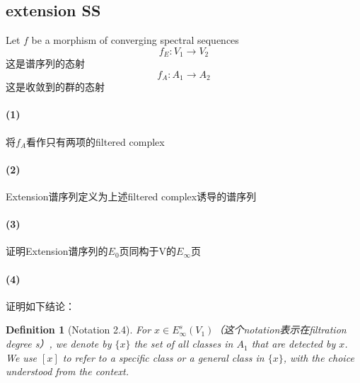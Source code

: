 \documentclass[12pt,a4paper]{article}
\title{}
\author{}
\newtheorem{defn}[equation]{Definition}
\begin{document}
\sffamily
\maketitle
\thispagestyle{empty}

\abstract{}
\tableofcontents

\large

\begin{sloppy}
 \section{extension SS}
Let $f$ be a morphism of converging spectral sequences
$$f_E: V_1\rightarrow V_2$$
这是谱序列的态射
$$f_A:A_1\rightarrow A_2$$
这是收敛到的群的态射

\paragraph{(1)} 将$f_A$看作只有两项的filtered complex

\paragraph{(2)} Extension谱序列定义为上述filtered complex诱导的谱序列

\paragraph{(3)} 证明Extension谱序列的$E_0$页同构于V的$E_\infty$页

\paragraph{(4)}证明如下结论：


\begin{defn}[Notation 2.4]
For $x \in E_\infty^{s}(V_1)$（这个notation表示在filtration degree s）, we denote by $\{x\}$ the set of all classes in $A_1$ that are detected by $x$. We use $[x]$ to refer to a specific class or a general class in $\{x\}$, with the choice understood from the context.
\end{defn}


\end{sloppy}
\end{document}
